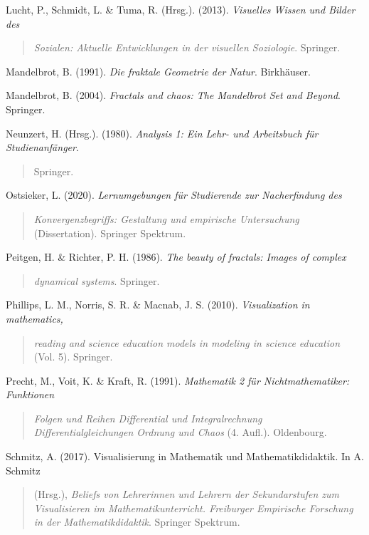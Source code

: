 \documentclass[a4paper, 12pt]{book}
\begin{document}
Lucht, P., Schmidt, L. \& Tuma, R. (Hrsg.). (2013). \emph{Visuelles
Wissen und Bilder des}

\begin{quote}
\emph{Sozialen: Aktuelle Entwicklungen in der visuellen Soziologie}.
Springer.
\end{quote}

Mandelbrot, B. (1991). \emph{Die fraktale Geometrie der Natur}.
Birkhäuser.

Mandelbrot, B. (2004). \emph{Fractals and chaos: The Mandelbrot Set and
Beyond}. Springer.

Neunzert, H. (Hrsg.). (1980). \emph{Analysis 1: Ein Lehr- und
Arbeitsbuch für Studienanfänger}.

\begin{quote}
Springer.
\end{quote}

Ostsieker, L. (2020). \emph{Lernumgebungen für Studierende zur
Nacherfindung des}

\begin{quote}
\emph{Konvergenzbegriffs: Gestaltung und empirische Untersuchung}
(Dissertation). Springer Spektrum.
\end{quote}

Peitgen, H. \& Richter, P. H. (1986). \emph{The beauty of fractals:
Images of complex}

\begin{quote}
\emph{dynamical systems}. Springer.
\end{quote}

Phillips, L. M., Norris, S. R. \& Macnab, J. S. (2010).
\emph{Visualization in mathematics,}

\begin{quote}
\emph{reading and science education models in modeling in science
education} (Vol. 5). Springer.
\end{quote}

Precht, M., Voit, K. \& Kraft, R. (1991). \emph{Mathematik 2 für
Nichtmathematiker: Funktionen}

\begin{quote}
\emph{Folgen und Reihen Differential und Integralrechnung
Differentialgleichungen Ordnung und Chaos} (4. Aufl.). Oldenbourg.
\end{quote}

Schmitz, A. (2017). Visualisierung in Mathematik und Mathematikdidaktik.
In A. Schmitz

\begin{quote}
(Hrsg.), \emph{Beliefs von Lehrerinnen und Lehrern der Sekundarstufen
zum Visualisieren im Mathematikunterricht. Freiburger Empirische
Forschung in der Mathematikdidaktik}. Springer Spektrum.
\end{quote}
\end{document}
